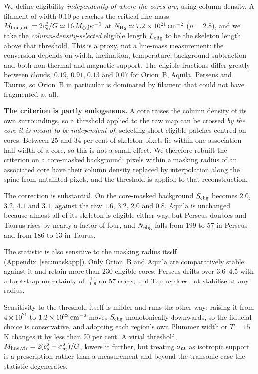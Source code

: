 \documentclass[usenatbib,twoside,twocolumn]{mnras}
\begin{document}
We define eligibility \emph{independently of where the cores are}, using column density. A filament of width $0.10$\,pc reaches the critical line mass $M_{\rm line,crit}=2c_s^2/G\simeq16\,M_\odot\,{\rm pc^{-1}}$ at $N_{\rm H_2}\simeq7.2\times10^{21}\,{\rm cm^{-2}}$ ($\mu=2.8$), and we take the \emph{column-density-selected} eligible length $L_{\rm elig}$ to be the skeleton length above that threshold. This is a proxy, not a line-mass measurement: the conversion depends on width, inclination, temperature, background subtraction and both non-thermal and magnetic support. The eligible fractions differ greatly between clouds, $0.19$, $0.91$, $0.13$ and $0.07$ for Orion~B, Aquila, Perseus and Taurus, so Orion~B in particular is dominated by filament that could not have fragmented at all.

\smallskip\noindent\textbf{The criterion is partly endogenous.} A core raises the column density of its own surroundings, so a threshold applied to the raw map can be crossed \emph{by the core it is meant to be independent of}, selecting short eligible patches centred on cores. Between $25$ and $34$ per cent of skeleton pixels lie within one association half-width of a core, so this is not a small effect. We therefore rebuilt the criterion on a core-masked background: pixels within a masking radius of an associated core have their column density replaced by interpolation along the spine from untainted pixels, and the threshold is applied to that reconstruction.

The correction is substantial. On the core-masked background $S_{\rm elig}$ becomes $2.0$, $3.2$, $4.1$ and $3.1$, against the raw $1.6$, $3.2$, $2.0$ and $0.8$. Aquila is unchanged because almost all of its skeleton is eligible either way, but Perseus doubles and Taurus rises by nearly a factor of four, and $N_{\rm elig}$ falls from $199$ to $57$ in Perseus and from $186$ to $13$ in Taurus.

The statistic is also sensitive to the masking radius itself (Appendix~\ref{sec:maskapp}). Only Orion~B and Aquila are comparatively stable against it and retain more than $230$ eligible cores; Perseus drifts over $3.6$--$4.5$ with a bootstrap uncertainty of $^{+1.1}_{-0.9}$ on $57$ cores, and Taurus does not stabilise at any radius.



Sensitivity to the threshold itself is milder and runs the other way: raising it from $4\times10^{21}$ to $1.2\times10^{22}\,{\rm cm^{-2}}$ moves $S_{\rm elig}$ monotonically downwards, so the fiducial choice is conservative, and adopting each region's own Plummer width or $T=15$\,K changes it by less than $20$ per cent. A virial threshold, $M_{\rm line,vir}=2(c_s^2+\sigma_{\rm nt}^2)/G$, lowers it further, but treating $\sigma_{\rm nt}$ as isotropic support is a prescription rather than a measurement and beyond the transonic case the statistic degenerates.
\end{document}
